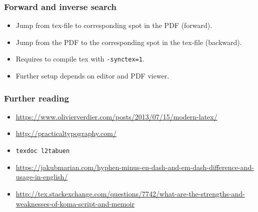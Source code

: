 \documentclass[aspectratio=1610,hyperref={colorlinks,linkcolor=}]{beamer}
\begin{document}
\begin{frame}
    \frametitle{Forward and inverse search}
    \begin{itemize}
        \item Jump from tex-file to corresponding spot in the PDF (forward).
        \item Jump from the PDF to the corresponding spot in the tex-file (backward).
        \item Requires to compile tex with \texttt{-synctex=1}.
        \item Further setup depends on editor and PDF viewer.
    \end{itemize}
\end{frame}

\begin{frame}
    \frametitle{Further reading}
    \begin{itemize}
        \item \url{https://www.olivierverdier.com/posts/2013/07/15/modern-latex/}
        \item \url{http://practicaltypography.com/}
        \item \texttt{texdoc l2tabuen}
        \item {\small \url{https://jakubmarian.com/hyphen-minus-en-dash-and-em-dash-difference-and-usage-in-english/}}
        \item \url{http://tex.stackexchange.com/questions/7742/what-are-the-strengths-and-weaknesses-of-koma-script-and-memoir}
    \end{itemize}
\end{frame}

\end{document}
